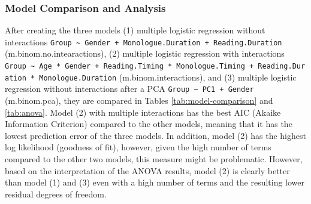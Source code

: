 \documentclass[
  english,
  doc,floatsintext]{apa6}
\begin{document}
\hypertarget{model-comparison-and-analysis}{%
\subsubsection{Model Comparison and Analysis}\label{model-comparison-and-analysis}}

After creating the three models (1) multiple logistic regression without interactions
\texttt{Group\ \textasciitilde{}\ Gender\ +\ Monologue.Duration\ +\ Reading.Duration} (m.binom.no.intearactions),
(2) multiple logistic regression with interactions \texttt{Group\ \textasciitilde{}\ Age\ *\ Gender\ +\ Reading.Timing\ *\ Monologue.Timing\ +\ Reading.Duration\ *\ Monologue.Duration}
(m.binom.interactions), and (3) multiple logistic regression without interactions after a PCA \texttt{Group\ \textasciitilde{}\ PC1\ +\ Gender} (m.binom.pca),
they are compared in Tables \ref{tab:model-comparison} and \ref{tab:anova}.
Model (2) with multiple interactions has the best AIC (Akaike Information Criterion) compared
to the other models, meaning that it has the lowest prediction error of the three models. In addition,
model (2) has the highest log likelihood (goodness of fit), however, given the high number of terms
compared to the other two models, this measure might be problematic. However, based on the interpretation
of the ANOVA results, model (2) is clearly better than model (1) and (3) even with a high number of
terms and the resulting lower residual degrees of freedom.
\end{document}
